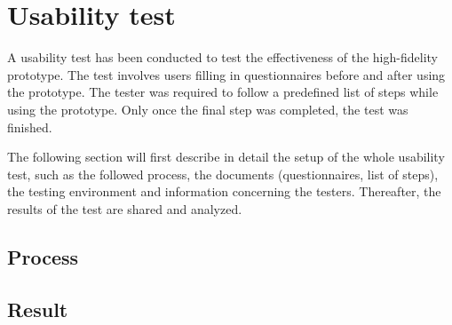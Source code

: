 \section{Usability test}
	
A usability test has been conducted to test the effectiveness of the high-fidelity prototype. The test involves users filling in questionnaires before and after using the prototype. The tester was required to follow a predefined list of steps while using the prototype. Only once the final step was completed, the test was finished. 

The following section will first describe in detail the setup of the whole usability test, such as the followed process, the documents (questionnaires, list of steps), the testing environment and information concerning the testers. Thereafter, the results of the test are shared and analyzed.

    \subsection{Process}



    \subsection{Result}

    